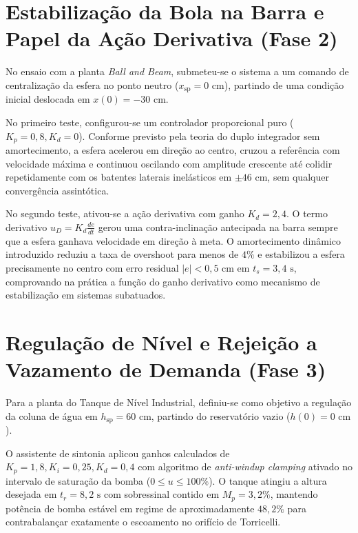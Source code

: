 \section{Estabilização da Bola na Barra e Papel da Ação Derivativa (Fase 2)}
\label{sec:resultados_ball_beam}

No ensaio com a planta \textit{Ball and Beam}, submeteu-se o sistema a um comando de centralização da esfera no ponto neutro ($x_{\text{sp}} = 0\text{ cm}$), partindo de uma condição inicial deslocada em $x(0) = -30\text{ cm}$.

No primeiro teste, configurou-se um controlador proporcional puro ($K_p = 0{,}8, K_d = 0$). Conforme previsto pela teoria do duplo integrador sem amortecimento, a esfera acelerou em direção ao centro, cruzou a referência com velocidade máxima e continuou oscilando com amplitude crescente até colidir repetidamente com os batentes laterais inelásticos em $\pm 46\text{ cm}$, sem qualquer convergência assintótica.

No segundo teste, ativou-se a ação derivativa com ganho $K_d = 2{,}4$. O termo derivativo $u_D = K_d \frac{de}{dt}$ gerou uma contra-inclinação antecipada na barra sempre que a esfera ganhava velocidade em direção à meta. O amortecimento dinâmico introduzido reduziu a taxa de overshoot para menos de $4\%$ e estabilizou a esfera precisamente no centro com erro residual $|e| < 0{,}5\text{ cm}$ em $t_s = 3{,}4\text{ s}$, comprovando na prática a função do ganho derivativo como mecanismo de estabilização em sistemas subatuados.

\section{Regulação de Nível e Rejeição a Vazamento de Demanda (Fase 3)}
\label{sec:resultados_tanque}

Para a planta do Tanque de Nível Industrial, definiu-se como objetivo a regulação da coluna de água em $h_{\text{sp}} = 60\text{ cm}$, partindo do reservatório vazio ($h(0) = 0\text{ cm}$).

O assistente de sintonia aplicou ganhos calculados de $K_p = 1{,}8, K_i = 0{,}25, K_d = 0{,}4$ com algoritmo de \textit{anti-windup clamping} ativado no intervalo de saturação da bomba ($0 \le u \le 100\%$). O tanque atingiu a altura desejada em $t_r = 8{,}2\text{ s}$ com sobressinal contido em $M_p = 3{,}2\%$, mantendo potência de bomba estável em regime de aproximadamente $48{,}2\%$ para contrabalançar exatamente o escoamento no orifício de Torricelli.

